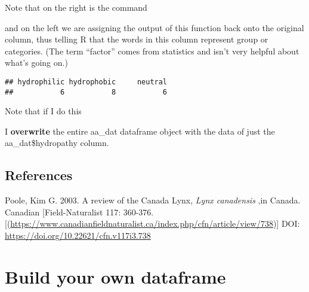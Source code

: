 \documentclass[
]{book}
\newenvironment{Shaded}{\begin{snugshade}}{\end{snugshade}}
\newcommand{\FunctionTok}[1]{\textcolor[rgb]{0.00,0.00,0.00}{#1}}
\newcommand{\NormalTok}[1]{#1}
\newcommand{\OtherTok}[1]{\textcolor[rgb]{0.56,0.35,0.01}{#1}}
\newcommand{\SpecialCharTok}[1]{\textcolor[rgb]{0.00,0.00,0.00}{#1}}
\begin{document}
Note that on the right is the command

\begin{Shaded}
\end{Shaded}

and on the left we are assigning the output of this function back onto the original column, thus telling R that the words in this column represent group or categories.
(The term ``factor'' comes from statistics and isn't very helpful about what's going on.)

\begin{Shaded}
\end{Shaded}

\begin{verbatim}
## hydrophilic hydrophobic     neutral 
##           6           8           6
\end{verbatim}

Note that if I do this

\begin{Shaded}
\end{Shaded}

I \textbf{overwrite} the entire aa\_dat dataframe object with the data of just the aa\_dat\$hydropathy column.

\hypertarget{references}{%
\section{References}\label{references}}

Poole, Kim G. 2003. A review of the Canada Lynx, \emph{Lynx canadensis} ,in Canada. Canadian {[}Field-Naturalist 117: 360-376.{[}(\url{https://www.canadianfieldnaturalist.ca/index.php/cfn/article/view/738}){]} DOI: \url{https://doi.org/10.22621/cfn.v117i3.738}

\hypertarget{build-your-own-dataframe}{%
\chapter{Build your own dataframe}\label{build-your-own-dataframe}}
\end{document}

